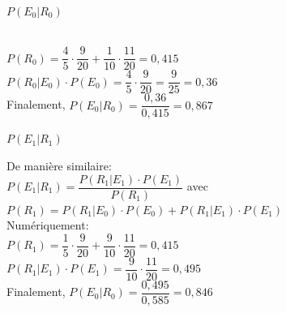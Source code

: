 \begin{exo}
\begin{subexo}{$P(E_0 | R_0)$}
\begin{flushleft}
				\\$P(R_0) = \dfrac{4}{5}\cdot\dfrac{9}{20} +\dfrac{1}{10}\cdot\dfrac{11}{20} = 0,415$
				\\$P(R_0|E_0)\cdot P(E_0) =  \dfrac{4}{5}\cdot \dfrac{9}{20} = \dfrac{9}{25} = 0,36$
				\\ Finalement, $P(E_0|R_0) = \dfrac{0,36}{0,415} = 0,867$
			\end{flushleft}
		\end{subexo}
		\begin{subexo}{$P(E_1 | R_1)$}
			\begin{flushleft}
				De manière similaire:
				\\$P(E_1|R_1) = \dfrac{P(R_1|E_1)\cdot P(E_1)}{P(R_1)}$ avec $P(R_1) = P(R_1 | E_0) \cdot P(E_0) + P(R_1 | E_1)\cdot P(E_1)$
				\\Numériquement:
				\\$P(R_1) = \dfrac{1}{5}\cdot\dfrac{9}{20} +\dfrac{9}{10}\cdot\dfrac{11}{20} = 0,415$
				\\$P(R_1|E_1)\cdot P(E_1) =  \dfrac{9}{10}\cdot \dfrac{11}{20} = 0,495$
				\\ Finalement, $P(E_0|R_0) = \dfrac{0,495}{0,585} = 0,846$
			\end{flushleft}
		\end{subexo}
	\end{exo}
